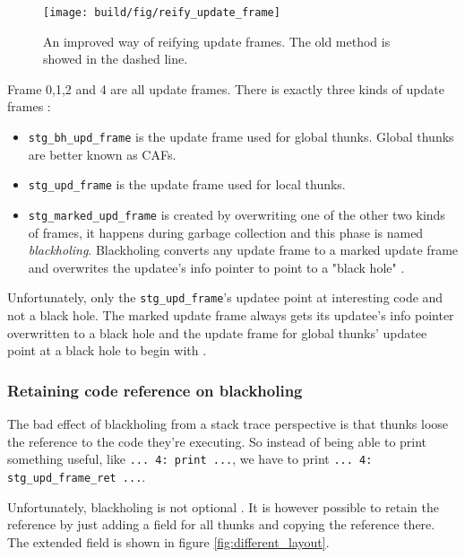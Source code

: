 \begin{figure}
\begin{mdframed}
  \texttt{[image: build/fig/reify\_update\_frame]}
  \caption{An improved way of reifying update frames. The old method is
  showed in the dashed line.}
  \label{fig:reify_update_frame}
\end{mdframed}
\end{figure}

Frame 0,1,2 and 4 are all update frames. There is exactly three kinds
of update frames \cite{github_updates_cmm}:

\begin{itemize}
  \item
    \texttt{stg\_bh\_upd\_frame} is the update frame used for global
      thunks. Global thunks are better known as CAFs.
  \item
    \texttt{stg\_upd\_frame} is the update frame used for local
  thunks. \item \texttt{stg\_marked\_upd\_frame} is created
  by overwriting one of the other two kinds of frames, it
  happens during garbage collection and this phase is named
  \emph{blackholing}. Blackholing converts any update frame to a
  marked update frame \cite{github_overwrite_update_frame} and
  overwrites the updatee's info pointer to point to a "black hole"
  \cite{github_overwrite_blackhole}.
\end{itemize}

Unfortunately, only the \texttt{stg\_upd\_frame}'s updatee point
at interesting code and not a black hole. The marked update frame
always gets its updatee's info pointer overwritten to a black
hole \cite{github_overwrite_blackhole} and the update frame
for global thunks' updatee point at a black hole to begin with
\cite{github_set_hdr_caf_blackhole}.

\subsubsection{Retaining code reference on blackholing}

The bad effect of blackholing from a stack trace perspective is
that thunks loose the reference to the code they're executing. So instead
of being able to print something useful, like  \texttt{... 4: print ...},
we have to print \texttt{... 4: stg\_upd\_frame\_ret ...}.

Unfortunately, blackholing is not optional
\cite{github_blackholing_not_optional}. It is however possible to
retain the reference by just adding a field for all thunks and
copying the reference there. The extended field is shown in figure
\ref{fig:different_layout}.

